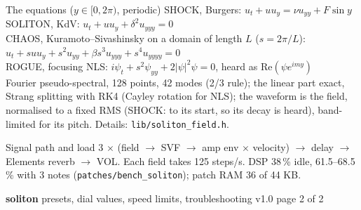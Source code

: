 \documentclass{article}
\begin{document}
\begin{minipage}[t]{68mm}\vspace{0pt}
\begin{card}{The equations (\(y \in [0, 2\pi)\), periodic)}
\fontsize{6.6}{7.8}\selectfont
SHOCK, Burgers: \(u_t + u u_y = \nu u_{yy} + F \sin y\)\\
SOLITON, KdV: \(u_t + u u_y + \delta^2 u_{yyy} = 0\)\\
CHAOS, Kuramoto--Sivashinsky on a domain of length \(L\) (\(s = 2\pi/L\)):
\(u_t + s u u_y + s^2 u_{yy} + \beta s^3 u_{yyy} + s^4 u_{yyyy} = 0\)\\
ROGUE, focusing NLS: \(i\psi_t + s^2 \psi_{yy} + 2|\psi|^2\psi = 0\), heard as \(\mathrm{Re}(\psi e^{imy})\)\\[0.4mm]
Fourier pseudo-spectral, 128 points, 42 modes (2/3 rule); the linear part exact, Strang splitting with RK4
(Cayley rotation for NLS); the waveform is the field, normalised to a fixed RMS (SHOCK: to its start, so
its decay is heard), band-limited for its pitch. Details: \texttt{lib/soliton\_field.h}.
\end{card}
\begin{card}{Signal path and load}
3 \(\times\) (field \(\to\) SVF \(\to\) amp env \(\times\) velocity) \(\to\) delay \(\to\) Elements reverb \(\to\) VOL.
Each field takes 125 steps/s. DSP 38\,\% idle, 61.5--68.5\,\% with 3 notes (\texttt{patches/bench\_soliton}); patch RAM 36 of 44 KB.
\end{card}
\end{minipage}

\newpage
{\fontsize{16}{18}\selectfont\bfseries soliton}\hspace{3mm}%
{\fontsize{9.5}{11}\selectfont presets, dial values, speed limits, troubleshooting}\hfill
{\fontsize{7}{8}\selectfont\color{black!55} v1.0 \textperiodcentered{} page 2 of 2}
\end{document}
